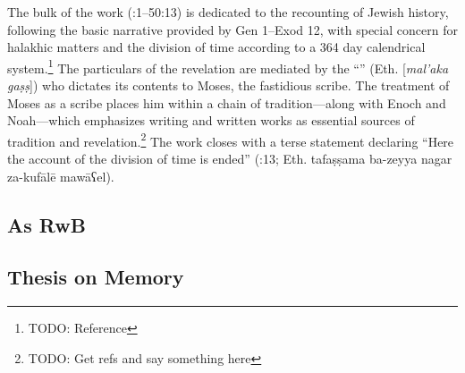 The bulk of the work (:1--50:13) is dedicated to the recounting of Jewish history, following the basic narrative provided by Gen 1--Exod 12, with special concern for halakhic matters and the division of time according to a 364 day calendrical system.\footnote{TODO: Reference} The particulars of the revelation are mediated by the ``\ap'' (Eth.  [\emph{mal'aka gaṣṣ}]) who dictates its contents to Moses, the fastidious scribe. The treatment of Moses as a scribe places him within a chain of tradition---along with Enoch and Noah---which emphasizes writing and written works as essential sources of tradition and revelation.\footnote{TODO: Get refs and say something here} The work closes with a terse statement declaring ``Here the account of the division of time is ended'' (:13; Eth. 
        {tafaṣṣama ba-zeyya nagar za-kufālē mawāʕel}).

\subsection{As RwB}


\subsection{Thesis on Memory}

